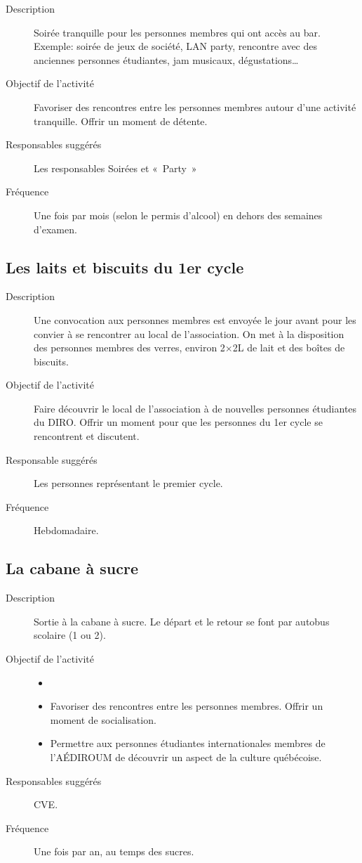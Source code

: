 \documentclass{aediroum}
\begin{document}
\begin{description}
    \item[Description] Soirée tranquille pour les personnes membres qui ont accès au bar. Exemple: soirée de jeux de société, LAN party, rencontre avec des anciennes personnes étudiantes, jam musicaux, dégustations\ldots{}
    \item[Objectif de l'activité] Favoriser des rencontres entre les personnes membres autour d'une activité tranquille. Offrir un moment de détente.
    \item[Responsables suggérés] Les responsables Soirées et «~Party~»
    \item[Fréquence] Une fois par mois (selon le permis d'alcool) en dehors des semaines d'examen.
\end{description}

\subsection{Les laits et biscuits du 1er cycle}\label{sec:laits-et-biscuits}

\begin{description}
    \item[Description] Une convocation aux personnes membres est envoyée le jour avant pour les convier à se rencontrer au local de l'association. On met à la disposition des personnes membres des verres, environ 2$\times$2L de lait et des boîtes de biscuits.
    \item[Objectif de l'activité] Faire découvrir le local de l'association à de nouvelles personnes étudiantes du DIRO. Offrir un moment pour que les personnes du 1er cycle se rencontrent et discutent.
    \item[Responsable suggérés] Les personnes représentant le premier cycle.
    \item[Fréquence] Hebdomadaire.
\end{description}

\subsection{La cabane à sucre}\label{sec:cabane-a-sucre}

\begin{description}
    \item[Description] Sortie à la cabane à sucre. Le départ et le retour se font par autobus scolaire (1 ou 2).
    \item[Objectif de l'activité]
    \begin{itemize}
        \item[]
        \item Favoriser des rencontres entre les personnes membres. Offrir un moment de socialisation.
        \item Permettre aux personnes étudiantes internationales membres de l'AÉDIROUM de découvrir un aspect de la culture québécoise.
    \end{itemize}
    \item[Responsables suggérés] CVE.
    \item[Fréquence] Une fois par an, au temps des sucres.
\end{description}
\end{document}
